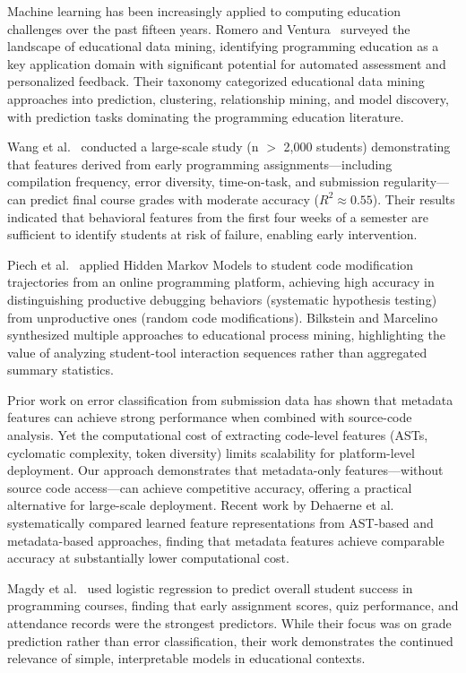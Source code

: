 \documentclass[10pt,a4paper]{article}
\begin{document}
Machine learning has been increasingly applied to computing education
challenges over the past fifteen years. Romero and
Ventura~\cite{romero2013data}
surveyed the landscape of educational data mining, identifying programming
education as a key application domain with significant potential for automated
assessment and personalized feedback. Their taxonomy categorized educational
data mining approaches into prediction, clustering, relationship mining, and
model discovery, with prediction tasks dominating the programming education
literature.

Wang et al.~\cite{wang2017learning} conducted a large-scale study (n $>$ 2,000
students) demonstrating that features derived from early programming
assignments---including compilation frequency, error diversity, time-on-task,
and submission regularity---can predict final course grades with moderate
accuracy ($R^2 \approx 0.55$). Their results indicated that behavioral
features from the first four weeks of a semester are sufficient to identify
students at risk of failure, enabling early intervention.

Piech et al.~\cite{effenberger2021validity} applied Hidden Markov Models to
student code modification trajectories from an online programming platform,
achieving high accuracy in distinguishing productive debugging behaviors
(systematic hypothesis testing) from unproductive ones (random code
modifications). Bilkstein and Marcelino~\cite{romero2013data}
synthesized multiple approaches to educational process mining, highlighting the
value of analyzing student-tool interaction sequences rather than aggregated
summary statistics.

Prior work on error classification from submission data has shown that
metadata features can achieve strong performance when combined with
source-code analysis. Yet the computational cost of extracting
code-level features (ASTs, cyclomatic complexity, token diversity)
limits scalability for platform-level deployment. Our approach demonstrates
that metadata-only features---without source code access---can achieve
competitive accuracy, offering a practical alternative for large-scale
deployment. Recent work by
Dehaerne et al.~\cite{dehaerne2025learned}
systematically compared learned feature representations from AST-based
and metadata-based approaches, finding that metadata features achieve
comparable accuracy at substantially lower computational cost.

Magdy et al.~\cite{alnahhas2020predicting} used logistic regression to predict
overall student success in programming courses, finding that early assignment
scores, quiz performance, and attendance records were the strongest predictors.
While their focus was on grade prediction rather than error classification,
their work demonstrates the continued relevance of simple, interpretable models
in educational contexts.
\end{document}
